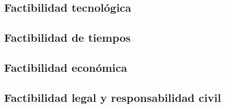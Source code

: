 \documentclass[../../main.tex]{subfiles}
\begin{document}
\subsection{Factibilidad tecnológica}\label{subsec:tecnologica}


\subsection{Factibilidad de tiempos}\label{subsec:tiempos}


\subsection{Factibilidad económica}\label{subsec:economica}


\subsection{Factibilidad legal y responsabilidad civil}\label{subsec:legalcivil}

\end{document}
